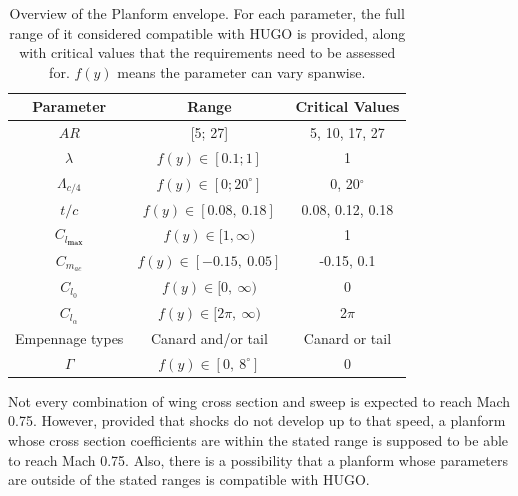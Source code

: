 \begin{table}[H]
    \centering
    \caption{Overview of the Planform envelope. For each parameter, the full range of it considered compatible with HUGO is provided, along with critical values that the requirements need to be assessed for. $f(y)$ means the parameter can vary spanwise. }
    \begin{tabular}{|c|c|c|}\hline
         \textbf{Parameter}& \textbf{Range} & \textbf{Critical Values} \\\hline\hline
         $AR$ & [5; 27]  & 5, 10, 17, 27 \\\hline
         $\lambda$ & $f(y)\in[0.1; 1]$ & 1 \\\hline
         $\Lambda_{c/4}$ & $f(y)\in[0; 20^\circ]$  & 0, 20$^\circ$ \\\hline
         $t/c$ & $f(y)\in[0.08,\ 0.18]$ & 0.08, 0.12, 0.18 \\\hline
         $C_{l_{\textbf{max}}}$ & $f(y)\in[1, \infty)$  & 1 \\\hline
         $C_{m_{ac}}$ & $f(y)\in[-0.15,\ 0.05]$ & -0.15, 0.1 \\\hline
         $C_{l_{0}}$ & $f(y)\in[0,\ \infty)$  & 0 \\\hline
         $C_{l_{\alpha}}$ & $f(y)\in[2\pi,\ \infty)$ & 2$\pi$ \\\hline
         Empennage types & Canard and/or tail  & Canard or tail \\\hline
         $\Gamma$ & $f(y)\in[0,\  8^\circ]$ & 0 \\\hline
    \end{tabular}
    
    \label{tab:planform_envelope}
\end{table}

Not every combination of wing cross section and sweep is expected to reach Mach 0.75. However, provided that shocks do not develop up to that speed, a planform whose cross section coefficients are within the stated range is supposed to be able to reach Mach 0.75. Also, there is a possibility that a planform whose parameters are outside of the stated ranges is compatible with HUGO.





